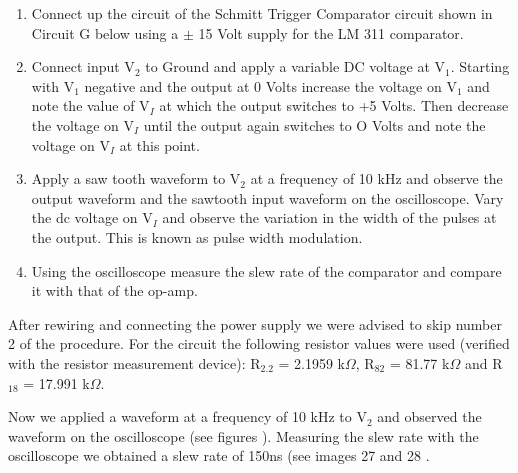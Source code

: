 \begin{enumerate}
	\item Connect up the circuit of the Schmitt Trigger Comparator circuit shown in Circuit G below using a $\pm$ 15 Volt supply for the LM 311 comparator.
\item Connect input V$_2$ to Ground and apply a variable DC voltage at V$_1$. Starting with V$_1$ negative and the output at 0 Volts increase the voltage on V$_1$ and note the value of V$_I$ at which the
output switches to +5 Volts. Then decrease the voltage on V$_I$ until the output again switches
to O Volts and note the voltage on V$_I$ at this point.

\item Apply a saw tooth waveform to V$_2$ at a frequency of 10 kHz and observe the output
waveform and the sawtooth input waveform on the oscilloscope. Vary the dc voltage on V$_I$
and observe the variation in the width of the pulses at the output. This is known as pulse
width modulation.

\item Using the oscilloscope measure the slew rate of the comparator and compare it with that of
the op-amp.
\end{enumerate}


After rewiring and connecting the power supply we were advised to skip number 2 of the procedure.
For the circuit the following resistor values were used (verified with the resistor measurement device): R$_{2.2}$ = 2.1959 k$\Omega$, R$_{82}$ = 81.77 k$\Omega$ and R$_{18}$ = 17.991 k$\Omega$.


Now we applied a waveform at a frequency of 10 kHz to V$_2$ and observed the waveform on the oscilloscope (see figures ).
Measuring the slew rate with the oscilloscope we obtained a slew rate of 150ns (see images 27 and 28 .
%
%
%
%
%

